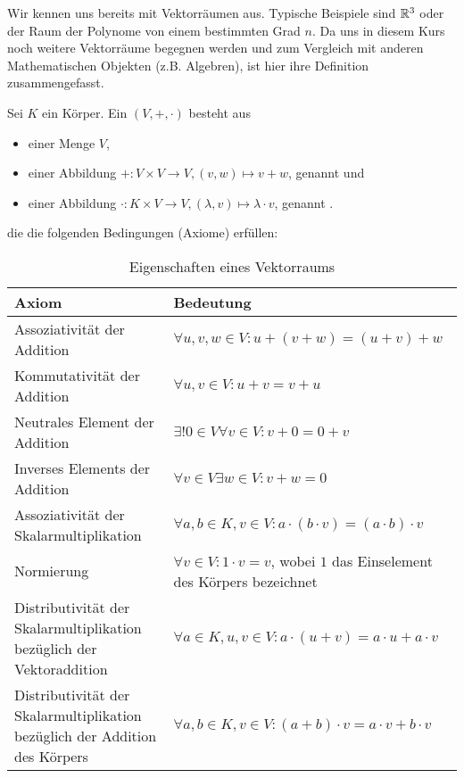 Wir kennen uns bereits mit Vektorräumen aus. Typische Beispiele sind $\mathbb{R}^3$ oder der Raum der Polynome von einem bestimmten Grad $n$. Da uns in diesem Kurs noch weitere Vektorräume begegnen werden und zum Vergleich mit anderen Mathematischen Objekten (z.B. Algebren), ist hier ihre Definition zusammengefasst.


\begin{definition}[Vektorräume]\label{vektorraeume:def}
	Sei $K$ ein Körper. Ein  $(V,+,\cdot)$ besteht aus
	\begin{itemize}
		\item einer Menge $V$,
		\item einer Abbildung $+: V \times V \to V, (v,w) \mapsto v+w$, genannt  und
		\item einer Abbildung $\cdot: K \times V \to V, (\lambda,v) \mapsto \lambda\cdot v$, genannt .
	\end{itemize}
	die die folgenden Bedingungen (Axiome) erfüllen:
		
		\begin{table}[!ht]
			\setlength\extrarowheight{10pt} %
			\begin{tabularx}{\textwidth}{p{7cm} X}
				
				\toprule
				\textbf{Axiom}                                                              & \textbf{Bedeutung} \\
				\midrule
				Assoziativität der Addition                                                 & $\forall u,v,w\in V: u+(v+w) = (u+v)+w$  \\
				Kommutativität der Addition                                                 & $\forall u,v\in V: u+v=v+u$ \\
				Neutrales Element der Addition                                              & $\exists! 0\in V\forall v\in V: v+0=0+v$ \\
				Inverses Elements der Addition                                              & $\forall v\in V\exists w \in V: v+w=0$ \\
				Assoziativität der Skalarmultiplikation                                     & $\forall a,b\in K, v\in V: a\cdot(b\cdot v) = (a\cdot b)\cdot v$ \\
				Normierung                                                                  & $\forall v\in V: 1 \cdot v = v$, wobei $1$ das Einselement des Körpers bezeichnet \\
				Distributivität der Skalarmultiplikation bezüglich der Vektoraddition       & $\forall a\in K, u,v\in V: a\cdot(u + v) = a\cdot u + a\cdot v$ \\
				Distributivität der Skalarmultiplikation bezüglich der Addition des Körpers & $\forall a,b\in K, v\in V: (a + b)\cdot v = a\cdot v + b\cdot v$ \\
				\bottomrule
			\end{tabularx}
			\caption{Eigenschaften eines Vektorraums}
		\end{table}
\end{definition}